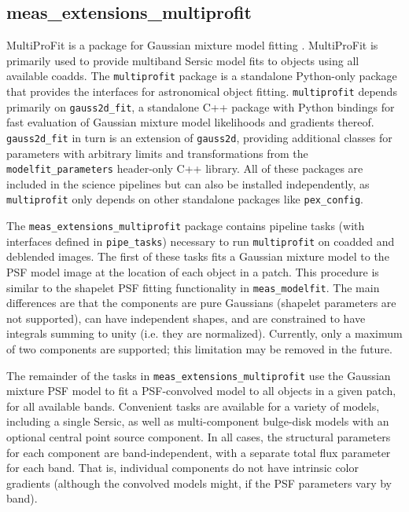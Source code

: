 \subsection{meas\_extensions\_multiprofit}
\label{sec:meas_extensions_multiprofit}

MultiProFit is a package for Gaussian mixture model fitting \citep{DMTN-312}.
MultiProFit is primarily used to provide multiband Sersic model fits to objects using all available coadds.
The \texttt{multiprofit} package is a standalone Python-only package that provides the interfaces for astronomical object fitting.
\texttt{multiprofit} depends primarily on \texttt{gauss2d\_fit}, a standalone C++ package with Python bindings for fast evaluation of Gaussian mixture model likelihoods and gradients thereof.
\texttt{gauss2d\_fit} in turn is an extension of \texttt{gauss2d}, providing additional classes for parameters with arbitrary limits and transformations from the \texttt{modelfit\_parameters} header-only C++ library.
All of these packages are included in the science pipelines but can also be installed independently, as \texttt{multiprofit} only depends on other standalone packages like \texttt{pex\_config}.

The \texttt{meas\_extensions\_multiprofit} package contains pipeline tasks (with interfaces defined in \texttt{pipe\_tasks}) necessary to run \texttt{multiprofit} on coadded and deblended images.
The first of these tasks fits a Gaussian mixture model to the PSF model image at the location of each object in a patch.
This procedure is similar to the shapelet PSF fitting functionality in \texttt{meas\_modelfit}.
The main differences are that the components are pure Gaussians (shapelet parameters are not supported), can have independent shapes, and are constrained to have integrals summing to unity (i.e. they are normalized).
Currently, only a maximum of two components are supported; this limitation may be removed in the future.

The remainder of the tasks in \texttt{meas\_extensions\_multiprofit} use the Gaussian mixture PSF model to fit a PSF-convolved model to all objects in a given patch, for all available bands.
Convenient tasks are available for a variety of models, including a single Sersic, as well as multi-component bulge-disk models with an optional central point source component.
In all cases, the structural parameters for each component are band-independent, with a separate total flux parameter for each band.
That is, individual components do not have intrinsic color gradients (although the convolved models might, if the PSF parameters vary by band).
